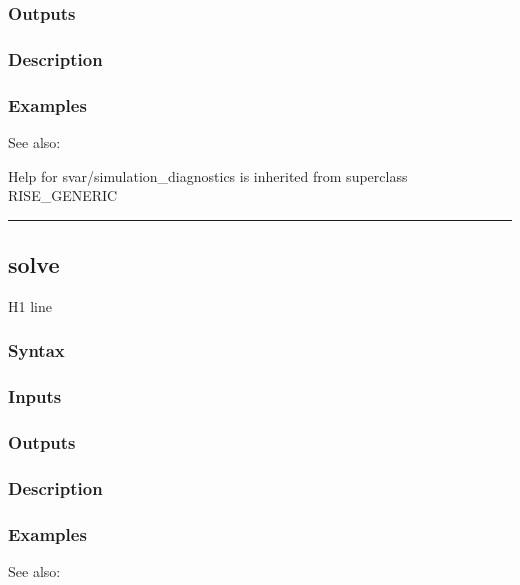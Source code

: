 \documentclass[letterpaper,10pt,english]{sphinxmanual}
\begin{document}
\subsubsection{Outputs}
\label{classes/models/@svar/svar:id122}

\subsubsection{Description}
\label{classes/models/@svar/svar:id123}

\subsubsection{Examples}
\label{classes/models/@svar/svar:id124}
See also:

Help for svar/simulation\_diagnostics is inherited from superclass RISE\_GENERIC


\bigskip\hrule{}\bigskip



\subsection{solve}
\label{classes/models/@svar/svar:id125}\label{classes/models/@svar/svar:solve}
H1 line


\subsubsection{Syntax}
\label{classes/models/@svar/svar:id126}

\subsubsection{Inputs}
\label{classes/models/@svar/svar:id127}

\subsubsection{Outputs}
\label{classes/models/@svar/svar:id128}

\subsubsection{Description}
\label{classes/models/@svar/svar:id129}

\subsubsection{Examples}
\label{classes/models/@svar/svar:id130}
See also:
\end{document}
